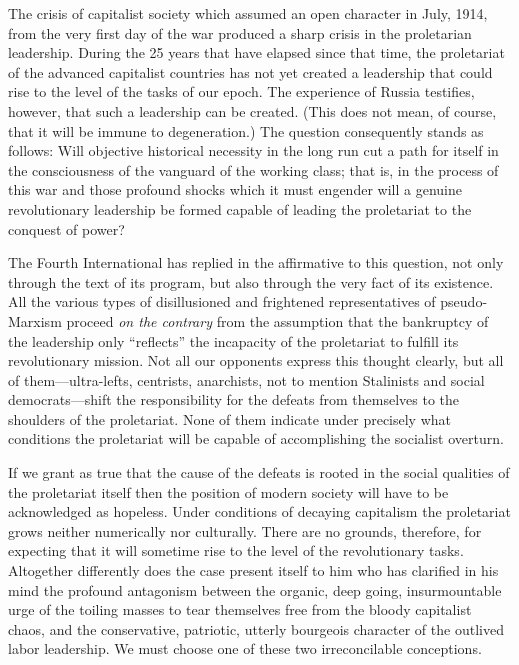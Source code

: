 The crisis of capitalist society which assumed an open character in July, 1914, from the very first day of the war produced a sharp crisis in the proletarian leadership. During the 25 years that have elapsed since that time, the proletariat of the advanced capitalist countries has not yet created a leadership that could rise to the level of the tasks of our epoch. The experience of Russia testifies, however, that such a leadership can be created. (This does not mean, of course, that it will be immune to degeneration.) The question consequently stands as follows: Will objective historical necessity in the long run cut a path for itself in the consciousness of the vanguard of the working class; that is, in the process of this war and those profound shocks which it must engender will a genuine revolutionary leadership be formed capable of leading the proletariat to the conquest of power?
\nowidow

The Fourth International has replied in the affirmative to this question, not only through the text of its program, but also through the very fact of its existence. All the various types of disillusioned and frightened representatives of pseudo-Marxism proceed \emph{on the contrary} from the assumption that the bankruptcy of the leadership only “reflects” the incapacity of the proletariat to fulfill its revolutionary mission. Not all our opponents express this thought clearly, but all of them---ultra-lefts, centrists, anarchists, not to mention Stalinists and social democrats---shift the responsibility for the defeats from themselves to the shoulders of the proletariat. None of them indicate under precisely what conditions the proletariat will be capable of accomplishing the socialist overturn.

If we grant as true that the cause of the defeats is rooted in the social qualities of the proletariat itself then the position of modern society will have to be acknowledged as hopeless. Under conditions of decaying capitalism the proletariat grows neither numerically nor culturally. There are no grounds, therefore, for expecting that it will sometime rise to the level of the revolutionary tasks. Altogether differently does the case present itself to him who has clarified in his mind the profound antagonism between the organic, deep going, insurmountable urge of the toiling masses to tear themselves free from the bloody capitalist chaos, and the conservative, patriotic, utterly bourgeois character of the outlived labor leadership. We must choose one of these two irreconcilable conceptions.

